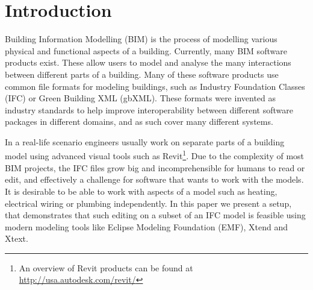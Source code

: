 

\setcounter{page}{1}
\section{Introduction}
Building Information Modelling (BIM) is the process of modelling various physical and functional aspects of a building. Currently, many BIM software products exist. These allow users to model and analyse the many interactions between different parts of a building. Many of these software products use common file formats for modeling buildings, such as Industry Foundation Classes (IFC) or Green Building XML (gbXML). These formats were invented as industry standards to help improve interoperability between different software packages in different domains, and as such cover many different systems.

In a real-life scenario engineers usually work on separate parts of a building model using advanced visual tools such as Revit\footnote{An overview of Revit products can be found at \url{http://usa.autodesk.com/revit/}}. Due to the complexity of most BIM projects, the IFC files grow big and incomprehensible for humans to read or edit, and effectively a challenge for software that wants to work with the models. It is desirable to be able to work with aspects of a model such as heating, electrical wiring or plumbing independently. In this paper we present a setup, that demonstrates that such editing on a subset of an IFC model is feasible using modern modeling tools like Eclipse Modeling Foundation (EMF), Xtend and Xtext.


